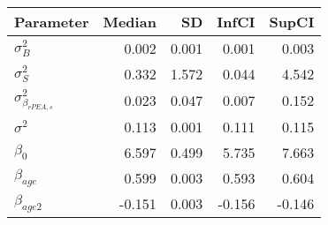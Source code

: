 \begin{table}[ht]
\centering
\begin{tabular}{lrrrr}
  \hline
Parameter & Median & SD & InfCI & SupCI \\ 
  \hline
$\sigma^{2}_{B}$ & 0.002 & 0.001 & 0.001 & 0.003 \\ 
  $\sigma^{2}_{S}$ & 0.332 & 1.572 & 0.044 & 4.542 \\ 
  $\sigma^{2}_{\beta_{rPEA,s}}$ & 0.023 & 0.047 & 0.007 & 0.152 \\ 
  $\sigma^{2}$ & 0.113 & 0.001 & 0.111 & 0.115 \\ 
  $\beta_{0}$ & 6.597 & 0.499 & 5.735 & 7.663 \\ 
  $\beta_{age}$ & 0.599 & 0.003 & 0.593 & 0.604 \\ 
  $\beta_{age2}$ & -0.151 & 0.003 & -0.156 & -0.146 \\ 
   \hline
\end{tabular}
\end{table}
